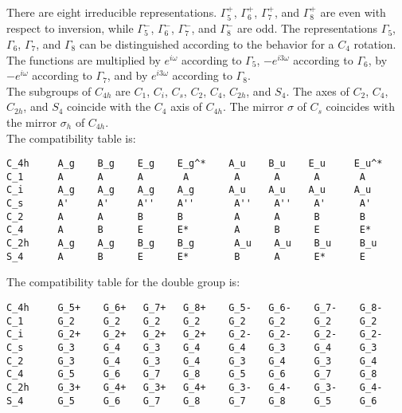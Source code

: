 \documentclass[12pt,a4paper,twoside]{report}
\begin{document}
There are eight irreducible representations. $\Gamma_5^+$, $\Gamma_6^+$,
$\Gamma_7^+$, and $\Gamma_8^+$ are even with respect to inversion, while
$\Gamma_5^-$, $\Gamma_6^-$, $\Gamma_7^-$, and $\Gamma_8^-$ are odd.
The representations $\Gamma_5$, $\Gamma_6$, $\Gamma_7$, and $\Gamma_8$ can
be distinguished according to the behavior for a $C_4$ rotation. The
functions are multiplied by $e^{i\omega}$ according to $\Gamma_5$,
$-e^{i3\omega}$ according to $\Gamma_6$, by $-e^{i\omega}$ according to
$\Gamma_7$, and by $e^{i3\omega}$ according to $\Gamma_8$.\\
The subgroups of $C_{4h}$ are $C_1$, $C_i$, $C_s$, $C_2$, $C_4$, $C_{2h}$,
and $S_4$.  The axes of $C_2$, $C_4$, $C_{2h}$, and $S_4$
coincide with the $C_4$ axis of $C_{4h}$.
The mirror $\sigma$ of $C_s$ coincides with the mirror $\sigma_h$ of $C_{4h}$. \\
The compatibility table is:

\begin{tcolorbox}
\begin{footnotesize}
\begin{verbatim}
C_4h     A_g    B_g    E_g    E_g^*    A_u    B_u    E_u     E_u^*
C_1      A      A      A       A        A      A      A       A
C_i      A_g    A_g    A_g    A_g      A_u    A_u    A_u     A_u
C_s      A'     A'     A''    A''       A''    A''    A'      A'
C_2      A      A      B      B         A      A      B       B
C_4      A      B      E      E*        A      B      E       E*
C_2h     A_g    A_g    B_g    B_g       A_u    A_u    B_u     B_u
S_4      A      B      E      E*        B      A      E*      E 
\end{verbatim}
\end{footnotesize}
\end{tcolorbox}

The compatibility table for the double group is:

\begin{tcolorbox}
\begin{footnotesize}
\begin{verbatim}
C_4h     G_5+    G_6+   G_7+   G_8+    G_5-   G_6-    G_7-    G_8-
C_1      G_2     G_2    G_2    G_2     G_2    G_2     G_2     G_2
C_i      G_2+    G_2+   G_2+   G_2+    G_2-   G_2-    G_2-    G_2-     
C_s      G_3     G_4    G_3    G_4     G_4    G_3     G_4     G_3
C_2      G_3     G_4    G_3    G_4     G_3    G_4     G_3     G_4
C_4      G_5     G_6    G_7    G_8     G_5    G_6     G_7     G_8
C_2h     G_3+    G_4+   G_3+   G_4+    G_3-   G_4-    G_3-    G_4-
S_4      G_5     G_6    G_7    G_8     G_7    G_8     G_5     G_6
\end{verbatim}
\end{footnotesize}
\end{tcolorbox}
\end{document}
